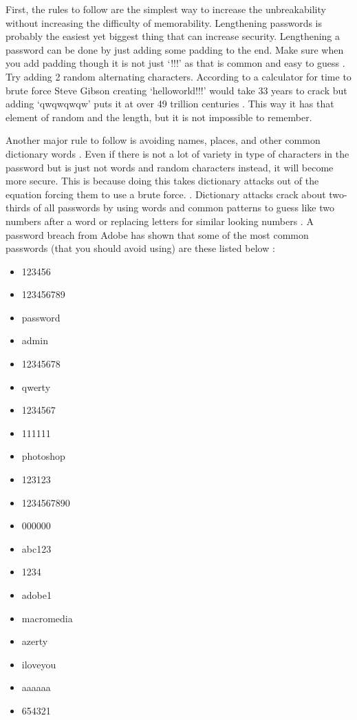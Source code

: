 \documentclass[acmsmall,nonacm]{acmart}
\begin{document}
First, the rules to follow are the simplest way to increase the unbreakability without increasing the difficulty of memorability. Lengthening passwords is probably the easiest yet biggest thing that can increase security. Lengthening a password can be done by just adding some padding to the end. Make sure when you add padding though it is not just ‘!!!’ as that is common and easy to guess \cite{rubenking_2021}. Try adding 2 random alternating characters. According to a calculator for time to brute force Steve Gibson creating ‘helloworld!!!’ would take 33 years to crack but adding ‘qwqwqwqw’ puts it at over 49 trillion centuries \cite{rubenking_2021}. This way it has that element of random and the length, but it is not impossible to remember.


Another major rule to follow is avoiding names, places, and other common dictionary words \cite{lee_2014}. Even if there is not a lot of variety in type of characters in the password but is just not words and random characters instead, it will become more secure. This is because doing this takes dictionary attacks out of the equation forcing them to use a brute force. \cite{rubenking_2021}. Dictionary attacks crack about two-thirds of all passwords by using words and common patterns to guess like two numbers after a word or replacing letters for similar looking numbers \cite{lee_2014}. A password breach from Adobe has shown that some of the most common passwords (that you should avoid using) are these listed below \cite{lee_2014}:

\begin{center}
\begin{multicols}{2}
\begin{itemize}
    \item 123456
    \item 123456789
    \item password
    \item admin
    \item 12345678
    \item qwerty
    \item 1234567
    \item 111111
    \item photoshop
    \item 123123
    \item 1234567890
    \item 000000
    \item abc123
    \item 1234
    \item adobe1
    \item macromedia
    \item azerty
    \item iloveyou
    \item aaaaaa
    \item 654321
\end{itemize}
\end{multicols}
\end{center}
\end{document}
